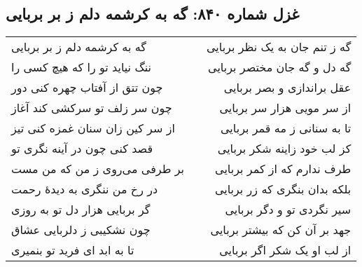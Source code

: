 \begin{center}
\section*{غزل شماره ۸۴۰: گه به کرشمه دلم ز بر بربایی}
\label{sec:840}
\begin{longtable}{l p{0.5cm} r}
گه به کرشمه دلم ز بر بربایی
&&
گه ز تنم جان به یک نظر بربایی
\\
ننگ نیاید تو را که هیچ کسی را
&&
گه دل و گه جان مختصر بربایی
\\
چون تتق از آفتاب چهره کنی دور
&&
عقل براندازی و بصر بربایی
\\
چون سر زلف تو سرکشی کند آغاز
&&
از سر مویی هزار سر بربایی
\\
از سر کین زان سنان غمزه کنی تیز
&&
تا به سنانی ز مه قمر بربایی
\\
قصد کنی چون در آینه نگری تو
&&
کز لب خود زاینه شکر بربایی
\\
بر طرفی می‌روی ز من که من مست
&&
طرف ندارم که از کمر بربایی
\\
در رخ من ننگری به دیدهٔ رحمت
&&
بلکه بدان بنگری که زر بربایی
\\
گر بربایی هزار دل تو به روزی
&&
سیر نگردی تو و دگر بربایی
\\
چون نشکیبی ز دلربایی عشاق
&&
جهد بر آن کن که بیشتر بربایی
\\
تا به ابد ای فرید تو بنمیری
&&
از لب او یک شکر اگر بربایی
\\
\end{longtable}
\end{center}
